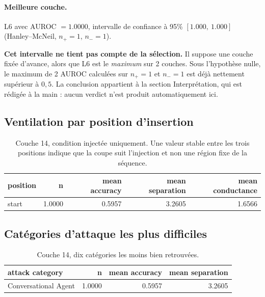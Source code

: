 \documentclass[11pt,a4paper]{article}
\begin{document}
\paragraph{Meilleure couche.} L6 avec
AUROC $= 1.0000$, intervalle de confiance à 95\%
$[1.000,\ 1.000]$ (Hanley--McNeil, $n_+ = 1$, $n_- = 1$).



\textbf{Cet intervalle ne tient pas compte de la sélection.} Il suppose une
couche fixée d'avance, alors que L6 est le \emph{maximum} sur
2 couches. Sous l'hypothèse nulle, le maximum de
2 AUROC calculées sur $n_+ = 1$ et $n_- = 1$ est déjà
nettement supérieur à $0{,}5$. La conclusion appartient à la section
Interprétation, qui est rédigée à la main : aucun verdict n'est produit
automatiquement ici.


\subsection{Ventilation par position d'insertion}

\begin{table}[htbp]
\centering
\small
\begin{tabular}{lrrrr}
\hline
position & n & mean accuracy & mean separation & mean conductance \\
\hline
start & 1.0000 & 0.5957 & 3.2605 & 1.6566 \\
\hline
\end{tabular}
\caption{Couche 14, condition injectée uniquement. Une valeur stable entre les trois positions indique que la coupe suit l'injection et non une région fixe de la séquence.}
\label{tab:positions}
\end{table}

\subsection{Catégories d'attaque les plus difficiles}

\begin{table}[htbp]
\centering
\small
\begin{tabular}{lrrr}
\hline
attack category & n & mean accuracy & mean separation \\
\hline
Conversational Agent & 1.0000 & 0.5957 & 3.2605 \\
\hline
\end{tabular}
\caption{Couche 14, dix catégories les moins bien retrouvées.}
\label{tab:categories}
\end{table}
\end{document}
